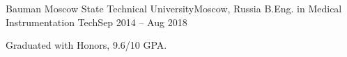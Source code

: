 \resumeSubheading
{Bauman Moscow State Technical University}{Moscow, Russia}
{B.Eng. in Medical Instrumentation Tech}{Sep 2014 -- Aug 2018}
\begin{itemize}[leftmargin=0in, label={}]
    \small{\item{
        {Graduated with Honors, 9.6/10 GPA.}\\
    }}
\end{itemize}
